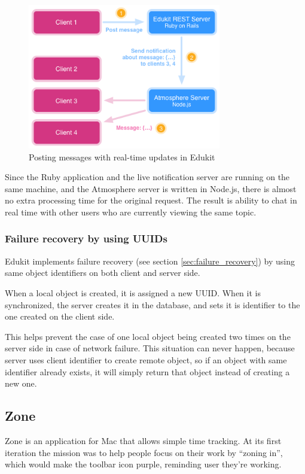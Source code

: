 \begin{figure}[htbp]
  \centering
    \includegraphics[height=2.5in]{figures/EdukitMessages.png}
  \caption{Posting messages with real-time updates in Edukit}
  \label{fig:figures_EdukitMessages}
\end{figure}


Since the Ruby application and the live notification server are running on the same machine, and the Atmosphere server is written in Node.js, there is almost no extra processing time for the original request. The result is ability to chat in real time with other users who are currently viewing the same topic.

\subsubsection{Failure recovery by using UUIDs}

Edukit implements failure recovery (see section \ref{sec:failure_recovery}) by using same object identifiers on both client and server side.

When a local object is created, it is assigned a new UUID. When it is synchronized, the server creates it in the database, and sets it is identifier to the one created on the client side.

This helps prevent the case of one local object being created two times on the server side in case of network failure. This situation can never happen, because server uses client identifier to create remote object, so if an object with same identifier already exists, it will simply return that object instead of creating a new one.

\subsection{Zone}

Zone is an application for Mac that allows simple time tracking. At its first iteration the mission was to help people focus on their work by ``zoning in'', \citep{zone_app} which would make the toolbar icon purple, reminding user they're working.

